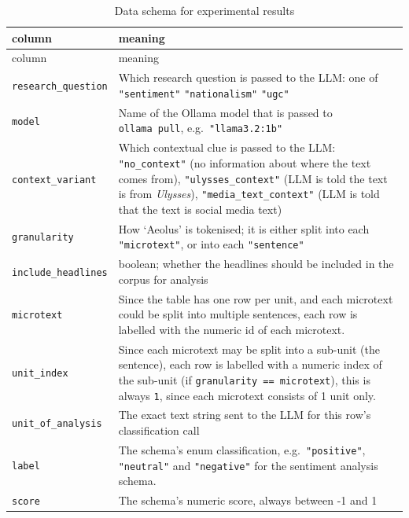 \documentclass[
  letterpaper,
  DIV=11,
  numbers=noendperiod]{scrartcl}
\begin{document}
\begin{longtable}[]{@{}
  >{\raggedright\arraybackslash}p{}
  >{\raggedright\arraybackslash}p{}@{}}
\caption{Data schema for experimental
results}\label{tbl-result-schema}\tabularnewline
\toprule\noalign{}
\begin{minipage}[b]{\linewidth}\raggedright
column
\end{minipage} & \begin{minipage}[b]{\linewidth}\raggedright
meaning
\end{minipage} \\
\midrule\noalign{}
\endfirsthead
\toprule\noalign{}
\begin{minipage}[b]{\linewidth}\raggedright
column
\end{minipage} & \begin{minipage}[b]{\linewidth}\raggedright
meaning
\end{minipage} \\
\midrule\noalign{}
\endhead
\bottomrule\noalign{}
\endlastfoot
\texttt{research\_question} & Which research question is passed to the
LLM: one of \texttt{"sentiment"} \textbar{} \texttt{"nationalism"}
\textbar{} \texttt{"ugc"} \\
\texttt{model} & Name of the Ollama model that is passed to
\texttt{ollama\ pull}, e.g.~\texttt{"llama3.2:1b"} \\
\texttt{context\_variant} & Which contextual clue is passed to the LLM:
\texttt{"no\_context"} (no information about where the text comes from),
\texttt{"ulysses\_context"} (LLM is told the text is from
\emph{Ulysses}), \texttt{"media\_text\_context"} (LLM is told that the
text is social media text) \\
\texttt{granularity} & How `Aeolus' is tokenised; it is either split
into each \texttt{"microtext"}, or into each \texttt{"sentence"} \\
\texttt{include\_headlines} & boolean; whether the headlines should be
included in the corpus for analysis \\
\texttt{microtext} & Since the table has one row per unit, and each
microtext could be split into multiple sentences, each row is labelled
with the numeric id of each microtext. \\
\texttt{unit\_index} & Since each microtext may be split into a sub-unit
(the sentence), each row is labelled with a numeric index of the
sub-unit (if
\texttt{granularity\ ==\ \textquotesingle{}microtext\textquotesingle{}}),
this is always \texttt{1}, since each microtext consists of 1 unit
only. \\
\texttt{unit\_of\_analysis} & The exact text string sent to the LLM for
this row's classification call \\
\texttt{label} & The schema's enum classification,
e.g.~\texttt{"positive"}, \texttt{"neutral"} and \texttt{"negative"} for
the sentiment analysis schema. \\
\texttt{score} & The schema's numeric score, always between -1 and 1 \\
\end{longtable}
\end{document}
